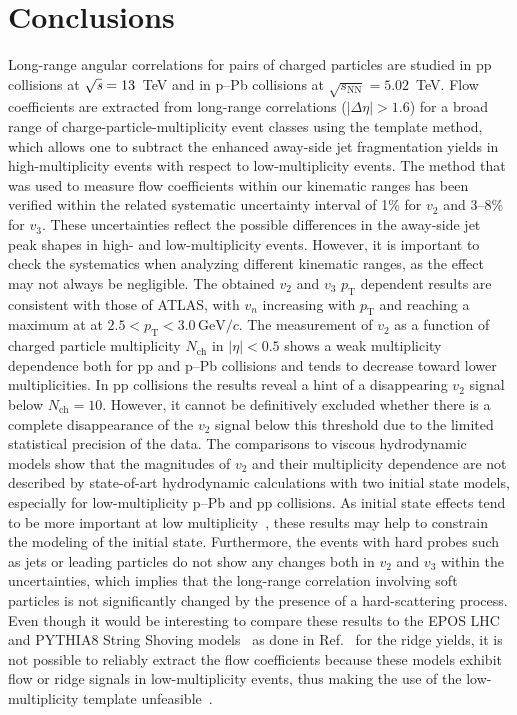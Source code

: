 
\section{Conclusions}
\label{sec:summary}
Long-range angular correlations for pairs of charged particles are studied in pp collisions at ${\sqrt{{\textit s}}}=13$~TeV and in p--Pb collisions at $\sqrt{s_\mathrm{NN}} = 5.02$~TeV. Flow coefficients are extracted from long-range correlations ($|\Delta\eta| > 1.6$) for a broad range of charge-particle-multiplicity event classes using the template method, which allows one to subtract the enhanced away-side jet fragmentation yields in high-multiplicity events with respect to low-multiplicity events. The method that was used to measure flow coefficients within our kinematic ranges has been verified within the related systematic uncertainty interval of 1\% for $v_{2}$ and 3--8\% for $v_{3}$. These uncertainties reflect the possible differences in the away-side jet peak shapes in high- and low-multiplicity events. However, it is important to check the systematics when analyzing different kinematic ranges, as the effect may not always be negligible.
The obtained $v_2$ and $v_3$ $p_\mathrm{T}$ dependent results are consistent with those of ATLAS, with $v_n$ increasing with $p_\mathrm{T}$ and reaching a maximum at at $2.5<p_\mathrm{T}<3.0\,\mathrm{GeV}/c$. 
The measurement of $v_2$ as a function of charged particle multiplicity $N_{\mathrm{ch}}$ in $|\eta|<0.5$ shows a weak multiplicity dependence both for pp and p--Pb collisions and tends to decrease toward lower multiplicities. In pp collisions the results reveal a hint of a disappearing $v_2$ signal below $N_{\mathrm{ch}} = 10$. However, it cannot be definitively excluded whether there is a complete disappearance of the $v_2$ signal below this threshold due to the limited statistical precision of the data.
The comparisons to viscous hydrodynamic models show that the magnitudes of $v_2$ and their multiplicity dependence are not described by state-of-art hydrodynamic calculations with two initial state models, especially for low-multiplicity p--Pb and pp collisions. As initial state effects tend to be more important at low multiplicity~\cite{Greif:2017bnr,Moreland:2018gsh}, these results may help to constrain the modeling of the initial state.
Furthermore, the events with hard probes such as jets or leading particles do not show any changes both in $v_2$ and $v_3$ within the uncertainties, which implies that the long-range correlation involving soft particles is not significantly changed by the presence of a hard-scattering process. Even though it would be interesting to compare these results to the EPOS LHC~\cite{Pierog:2013ria} and PYTHIA8 String Shoving models~\cite{Bierlich:2017vhg,Bierlich:2019ixq} as done in Ref.~\cite{ALICE:2012eyl} for the ridge yields, it is not possible to reliably extract the flow coefficients because these models exhibit flow or ridge signals in low-multiplicity events, thus making the use of the low-multiplicity template unfeasible~\cite{Ji:2023eqn}.

